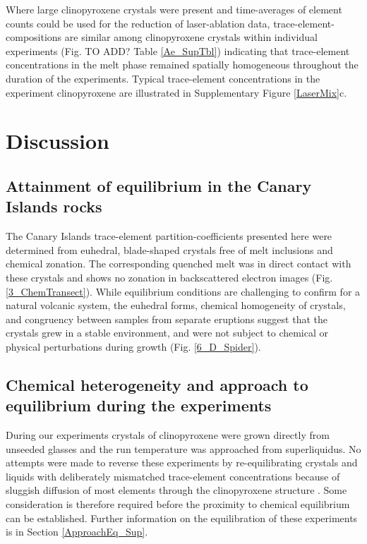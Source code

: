 \documentclass[review,authoryear,12pt]{elsarticle}
\begin{document}
Where large clinopyroxene crystals were present and time-averages of element counts could be used for the reduction of laser-ablation data, trace-element-compositions are similar among clinopyroxene crystals within individual experiments (Fig. TO ADD? Table \ref{Ae_SupTbl}) indicating that trace-element concentrations in the melt phase remained spatially homogeneous throughout the duration of the experiments. Typical trace-element concentrations in the experiment clinopyroxene are illustrated in Supplementary Figure \ref{LaserMix}c.

	
\newpage

\section{Discussion}
\subsection{Attainment of equilibrium in the Canary Islands rocks}
The Canary Islands trace-element partition-coefficients presented here were determined from euhedral, blade-shaped crystals free of melt inclusions and chemical zonation. The corresponding quenched melt was in direct contact with these crystals and shows no zonation in backscattered electron images (Fig. \ref{3_ChemTransect}). While equilibrium conditions are challenging to confirm for a natural volcanic system, the euhedral forms, chemical homogeneity of crystals, and congruency between samples from separate eruptions suggest that the crystals grew in a stable environment, and were not subject to chemical or physical perturbations during growth (Fig. \ref{6_D_Spider}).	

\subsection{Chemical heterogeneity and approach to equilibrium during the experiments}

During our experiments crystals of clinopyroxene were grown directly from unseeded glasses and the run temperature was approached from superliquidus. No attempts were made to reverse these experiments by re-equilibrating crystals and liquids with deliberately mismatched trace-element concentrations because of sluggish diffusion of most elements through the clinopyroxene structure \citep{VanOrman2001,Zhang2010}. Some consideration is therefore required before the proximity to chemical equilibrium can be established. Further information on the equilibration of these experiments is in Section \ref{ApproachEq_Sup}.
\end{document}
